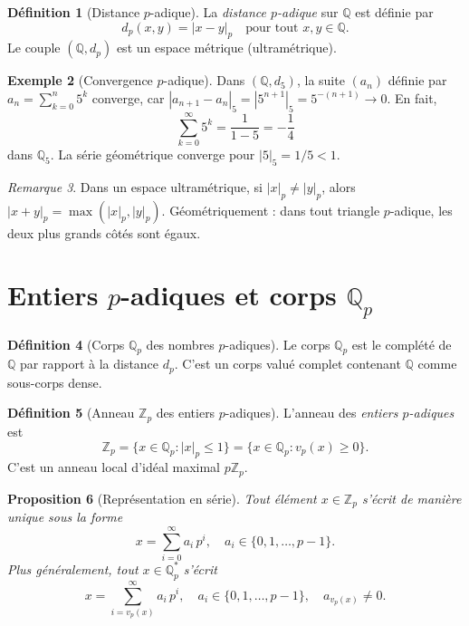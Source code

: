\documentclass[12pt,a4paper,openany]{book}
\theoremstyle{definition}
\newtheorem{definition}{Définition}[chapter]
\newtheorem{exemple}[definition]{Exemple}
\theoremstyle{plain}
\newtheorem{proposition}[definition]{Proposition}
\theoremstyle{remark}
\newtheorem{remarque}[definition]{Remarque}
\newcommand{\Z}{\mathbb{Z}}
\newcommand{\Q}{\mathbb{Q}}
\newcommand{\abs}[1]{\left|#1\right|}
\begin{document}
\begin{definition}[Distance $p$-adique]
\label{def:distance-p-adique}
La \emph{distance $p$-adique} sur $\Q$ est définie par
\[
  d_p(x, y) = \abs{x - y}_p \quad \text{pour tout } x, y \in \Q.
\]
Le couple $(\Q, d_p)$ est un espace métrique (ultramétrique).
\end{definition}

\begin{exemple}[Convergence $p$-adique]
\label{ex:convergence-p-adique}
Dans $(\Q, d_5)$, la suite $(a_n)$ définie par $a_n = \sum_{k=0}^{n} 5^k$ converge,
car $\abs{a_{n+1} - a_n}_5 = \abs{5^{n+1}}_5 = 5^{-(n+1)} \to 0$. En fait,
\[
  \sum_{k=0}^{\infty} 5^k = \frac{1}{1 - 5} = -\frac{1}{4}
\]
dans $\Q_5$. La série géométrique converge pour $\abs{5}_5 = 1/5 < 1$.
\end{exemple}

\begin{remarque}
\label{rem:tout-triangle-isocele}
Dans un espace ultramétrique, si $\abs{x}_p \neq \abs{y}_p$, alors
$\abs{x + y}_p = \max(\abs{x}_p, \abs{y}_p)$. Géométriquement : dans tout triangle
$p$-adique, les deux plus grands côtés sont égaux.
\end{remarque}

\section{Entiers \texorpdfstring{$p$}{p}-adiques et corps \texorpdfstring{$\Q_p$}{Qp}}
\label{sec:entiers-p-adiques}

\begin{definition}[Corps $\Q_p$ des nombres $p$-adiques]
\label{def:Qp}
Le corps $\Q_p$\index{Qp@$\Q_p$} est le complété de $\Q$ par rapport à la
distance $d_p$. C'est un corps valué complet contenant $\Q$ comme sous-corps
dense.
\end{definition}

\begin{definition}[Anneau $\Z_p$ des entiers $p$-adiques]
\label{def:Zp}
L'anneau des \emph{entiers $p$-adiques}\index{Zp@$\Z_p$} est
\[
  \Z_p = \bigl\{ x \in \Q_p : \abs{x}_p \leq 1 \bigr\}
  = \bigl\{ x \in \Q_p : v_p(x) \geq 0 \bigr\}.
\]
C'est un anneau local d'idéal maximal $p\Z_p$.
\end{definition}

\begin{proposition}[Représentation en série]
\label{prop:serie-p-adique}
Tout élément $x \in \Z_p$ s'écrit de manière unique sous la forme
\[
  x = \sum_{i=0}^{\infty} a_i \, p^i, \quad a_i \in \{0, 1, \ldots, p-1\}.
\]
Plus généralement, tout $x \in \Q_p^*$ s'écrit
\[
  x = \sum_{i=v_p(x)}^{\infty} a_i \, p^i, \quad a_i \in \{0, 1, \ldots, p-1\},
  \quad a_{v_p(x)} \neq 0.
\]
\end{proposition}
\end{document}
